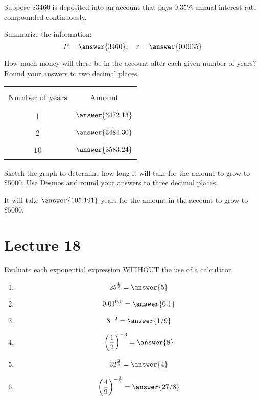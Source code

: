 \documentclass{ximera}
\begin{document}
  \begin{problem}\label{prob:160hom7prob6}
  Suppose $\$3460$ is deposited into an account that pays $0.35\%$ annual interest rate compounded continuously.  
  
  Summarize the information:
  $$P=\answer{3460},\quad r=\answer{0.0035}$$
  
  How much money will there be in the account after each given number of years?  Round your answers to two decimal places.
  \begin{center}
\begin{tabular}{|c|c|}
 \hline
 &   \\
Number of years &  Amount \\
 &  \\
  \hline
  &  \\
 $1$ & $\answer{3472.13}$ \\
  & \\
 \hline
 &  \\
 $2$ & $\answer{3484.30}$ \\
  & \\
 \hline
 &  \\
 $10$ & $\answer{3583.24}$ \\
  & \\
 \hline
   \end{tabular}
\end{center}    
Sketch the graph to determine how long it will take for the amount to grow to  $\$5000$.  Use Desmos and round your answers to three decimal places.
  
  \begin{center}  
\end{center}

It will take $\answer{105.191}$ years for the amount in the account to grow to $\$5000$.  
  \end{problem}
  
\section{Lecture 18}

\begin{problem}\label{prob:160hom7prob7}
Evaluate each exponential expression WITHOUT the use of a calculator.  
\begin{enumerate}
    \item $$25^{\frac{1}{2}}=\answer{5}$$
    \item $$0.01^{0.5}=\answer{0.1}$$
    \item $$3^{-2}=\answer{1/9}$$
    \item $$\left(\frac{1}{2}\right)^{-3}=\answer{8}$$
    \item $$32^{\frac{2}{5}}=\answer{4}$$
    \item $$\left(\frac{4}{9}\right)^{-\frac{3}{2}}=\answer{27/8}$$
\end{enumerate}
\end{problem}
\end{document}
